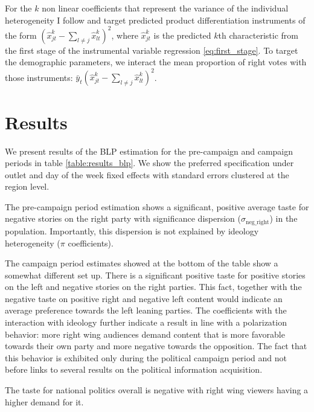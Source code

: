 \documentclass[12pt]{article}
\begin{document}
	
	For the $ k $ non linear coefficients that represent the variance of the individual heterogeneity I follow \cite{gandhi2019measuring} and target predicted product differentiation instruments of the form $ \left(\hat{x}_{jt}^k- \sum_{l \neq j} \hat{x}_{lt}^k\right)^2 $, where $ \hat{x}_{jt}^k $ is the predicted $ k $th characteristic from the first stage of the instrumental variable regression \ref{eq:first_stage}. To target the demographic parameters, we interact the mean proportion of right votes with those instruments: $ \bar{y}_t\left(\hat{x}_{jt}^k- \sum_{l \neq j} \hat{x}_{lt}^k\right)^2 $.
	
	
	
	
	
	
	\section{Results}
	
	\label{section:results}
	
	
	We present results of the BLP estimation for the pre-campaign and campaign periods in table   \ref{table:results_blp}. We show the preferred specification under outlet and day of the week fixed effects with standard errors clustered at the region level. 
	
	The pre-campaign period estimation shows a significant, positive average taste for negative stories on the right party with significance dispersion ($\sigma_{\text{neg\_right}}$) in the population. Importantly, this dispersion is not explained by ideology heterogeneity ($\pi$ coefficients).
	
	
	
	The campaign period estimates showed at the bottom of the table show a somewhat different set up. There is a significant positive taste for positive stories on the left and negative stories on the right parties. This fact, together with the negative taste on positive right and negative left content would indicate an average preference towards the left leaning parties. The coefficients with the interaction with ideology further indicate a result in line with a polarization behavior: more right wing audiences demand content that is more favorable towards their own party and more negative towards the opposition. The fact that this behavior is exhibited only during the political campaign period and not before links to several results on the political information acquisition.  
	
	The taste for national politics overall is negative with right wing viewers having a higher demand for it. 
	
\end{document}
